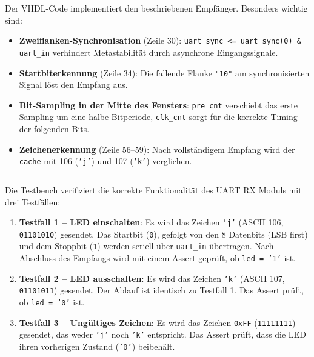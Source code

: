 \newpage

\inputminted[linenos,breaklines,fontsize=\small]{vhdl}{A4_Abgabe/code/rtl/uart_rx.vhd}

Der VHDL-Code implementiert den beschriebenen Empfänger. Besonders wichtig sind:

\begin{itemize}
  \item \textbf{Zweiflanken-Synchronisation} (Zeile 30): \texttt{uart\_sync <= uart\_sync(0) \& uart\_in} verhindert Metastabilität durch asynchrone Eingangssignale.
  \item \textbf{Startbiterkennung} (Zeile 34): Die fallende Flanke \texttt{"10"} am synchronisierten Signal löst den Empfang aus.
  \item \textbf{Bit-Sampling in der Mitte des Fensters}: \texttt{pre\_cnt} verschiebt das erste Sampling um eine halbe Bitperiode, \texttt{clk\_cnt} sorgt für die korrekte Timing der folgenden Bits.
  \item \textbf{Zeichenerkennung} (Zeile 56--59): Nach vollständigem Empfang wird der \texttt{cache} mit 106 (\texttt{'j'}) und 107 (\texttt{'k'}) verglichen.
\end{itemize}

\newpage

\inputminted[linenos,breaklines,fontsize=\small]{vhdl}{A4_Abgabe/code/sim/uart_rx_tb.vhd}

Die Testbench verifiziert die korrekte Funktionalität des UART RX Moduls mit drei Testfällen:

\begin{enumerate}
  \item \textbf{Testfall 1 -- LED einschalten}: Es wird das Zeichen \texttt{'j'} (ASCII 106, \texttt{01101010}) gesendet. 
  Das Startbit (\texttt{0}), gefolgt von den 8 Datenbits (LSB first) und dem Stoppbit (\texttt{1}) werden seriell über \texttt{uart\_in} übertragen.
  Nach Abschluss des Empfangs wird mit einem Assert geprüft, ob \texttt{led = '1'} ist.

  \item \textbf{Testfall 2 -- LED ausschalten}: Es wird das Zeichen \texttt{'k'} (ASCII 107, \texttt{01101011}) gesendet.
  Der Ablauf ist identisch zu Testfall 1. Das Assert prüft, ob \texttt{led = '0'} ist.

  \item \textbf{Testfall 3 -- Ungültiges Zeichen}: Es wird das Zeichen \texttt{0xFF} (\texttt{11111111}) gesendet, 
  das weder \texttt{'j'} noch \texttt{'k'} entspricht. Das Assert prüft, dass die LED ihren vorherigen Zustand (\texttt{'0'}) beibehält.
\end{enumerate}

